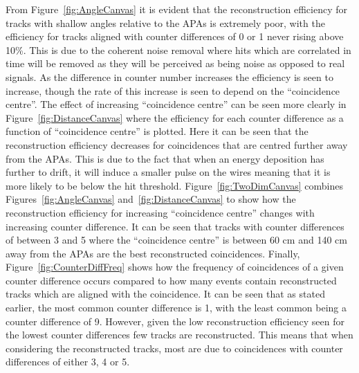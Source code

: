From Figure~\ref{fig:AngleCanvas} it is evident that the reconstruction efficiency for tracks with shallow angles relative to the APAs is extremely poor, with the efficiency for tracks aligned with counter differences of 0 or 1 never rising above 10\%. This is due to the coherent noise removal where hits which are correlated in time will be removed as they will be perceived as being noise as opposed to real signals. As the difference in counter number increases the efficiency is seen to increase, though the rate of this increase is seen to depend on the ``coincidence centre''. The effect of increasing ``coincidence centre'' can be seen more clearly in Figure~\ref{fig:DistanceCanvas} where the efficiency for each counter difference as a function of ``coincidence centre'' is plotted. Here it can be seen that the reconstruction efficiency decreases for coincidences that are centred further away from the APAs. This is due to the fact that when an energy deposition has further to drift, it will induce a smaller pulse on the wires meaning that it is more likely to be below the hit threshold. Figure~\ref{fig:TwoDimCanvas} combines Figures~\ref{fig:AngleCanvas} and~\ref{fig:DistanceCanvas} to show how the reconstruction efficiency for increasing ``coincidence centre'' changes with increasing counter difference. It can be seen that tracks with counter differences of between 3 and 5 where the ``coincidence centre'' is between 60 cm and 140 cm away from the APAs are the best reconstructed coincidences. Finally, Figure~\ref{fig:CounterDiffFreq} shows how the frequency of coincidences of a given counter difference occurs compared to how many events contain reconstructed tracks which are aligned with the coincidence. It can be seen that as stated earlier, the most common counter difference is 1, with the least common being a counter difference of 9. However, given the low reconstruction efficiency seen for the lowest counter differences few tracks are reconstructed. This means that when considering the reconstructed tracks, most are due to coincidences with counter differences of either 3, 4 or 5.

